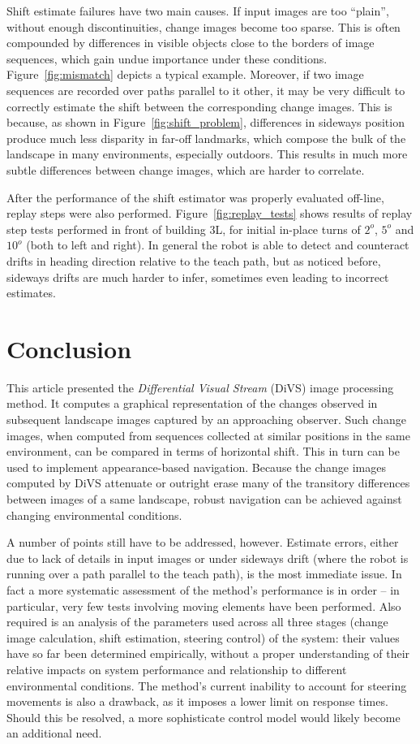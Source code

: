 \documentclass[twocolumn, 9pt,fleqn]{jsproceedings}
\begin{document}
Shift estimate failures have two main causes. If input images are too ``plain'', without enough discontinuities, change images become too sparse. This is often compounded by differences in visible objects close to the borders of image sequences, which gain undue importance under these conditions. Figure~\ref{fig:mismatch} depicts a typical example. Moreover, if two image sequences are recorded over paths parallel to it other, it may be very difficult to correctly estimate the shift between the corresponding change images. This is because, as shown in Figure~\ref{fig:shift_problem}, differences in sideways position produce much less disparity in far-off landmarks, which compose the bulk of the landscape in many environments, especially outdoors. This results in much more subtle differences between change images, which are harder to correlate.

After the performance of the shift estimator was properly evaluated off-line, replay steps were also performed. Figure~\ref{fig:replay_tests} shows results of replay step tests performed in front of building 3L, for initial in-place turns of $2^o$, $5^o$ and $10^o$ (both to left and right). In general the robot is able to detect and counteract drifts in heading direction relative to the teach path, but as noticed before, sideways drifts are much harder to infer, sometimes even leading to incorrect estimates.

\section{Conclusion}

This article presented the \textit{Differential Visual Stream} (DiVS) image processing method. It computes a graphical representation of the changes observed in subsequent landscape images captured by an approaching observer. Such change images, when computed from sequences collected at similar positions in the same environment, can be compared in terms of horizontal shift. This in turn can be used to implement appearance-based navigation. Because the change images computed by DiVS attenuate or outright erase many of the transitory differences between images of a same landscape, robust navigation can be achieved against changing environmental conditions.

A number of points still have to be addressed, however. Estimate errors, either due to lack of details in input images or under sideways drift (where the robot is running over a path parallel to the teach path), is the most immediate issue. In fact a more systematic assessment of the method's performance is in order -- in particular, very few tests involving moving elements have been performed. Also required is an analysis of the parameters used across all three stages (change image calculation, shift estimation, steering control) of the system: their values have so far been determined empirically, without a proper understanding of their relative impacts on system performance and relationship to different environmental conditions. The method's current inability to account for steering movements is also a drawback, as it imposes a lower limit on response times. Should this be resolved, a more sophisticate control model would likely become an additional need.
\end{document}
